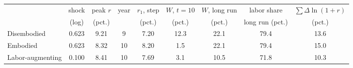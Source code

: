 \begin{tabular}{lcccccccc}\toprule
 & shock & peak $r$ & year & $r_1$, step & $W$, $t{=}10$ & $W$, long run & labor share & $\sum\Delta\ln(1+r)$\\
 & (log) & (pct.) & & (pct.) & (pct.) & (pct.) & long run (pct.) & (pct.)\\\midrule
Disembodied & 0.623 & 9.21 & 9 & 7.20 & 12.3 & 22.1 & 79.4 & 13.6\\
Embodied & 0.623 & 8.32 & 10 & 8.20 & 1.5 & 22.1 & 79.4 & 15.0\\
Labor-augmenting & 0.100 & 8.41 & 10 & 7.69 & 3.1 & 10.5 & 71.8 & 10.3\\
\bottomrule\end{tabular}
